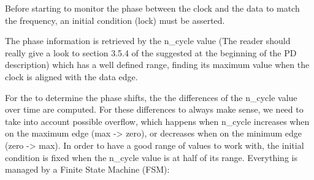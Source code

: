\documentclass[letterpaper,10pt,english,openany,oneside]{sphinxmanual}
\begin{document}
Before starting to monitor the phase between the clock and the data to match the frequency, an initial condition (lock) must be asserted.

The phase information is retrieved by the n\_cycle value (The reader should really give a look to section 3.5.4 of the  suggested at the beginning of the PD description) which has a well defined range, finding its maximum value when the clock is aligned with the data edge.

For the {\hyperref[\detokenize{code_explanation/phase_detector:locker-monitoring-ref}]{}} to determine the phase shifts, the the differences of the n\_cycle value over time are computed. For these differences to always make sense, we need to take into account possible overflow, which happens when n\_cycle increases when on the maximum edge (max -\textgreater{} zero), or decreases when on the minimum edge (zero -\textgreater{} max). In order to have a good range of values to work with, the initial condition is fixed when the n\_cycle value is at half of its range. Everything is managed by a Finite State Machine (FSM):
\end{document}
